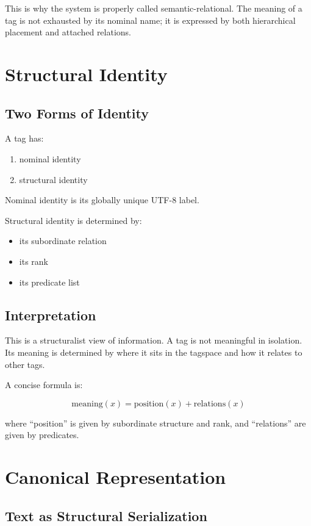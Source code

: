 \documentclass{article}
\begin{document}
This is why the system is properly called semantic-relational. The meaning
of a tag is not exhausted by its nominal name; it is expressed by both
hierarchical placement and attached relations.

\section{Structural Identity}

\subsection{Two Forms of Identity}

A tag has:

\begin{enumerate}[label=\arabic*.]
    \item nominal identity
    \item structural identity
\end{enumerate}

Nominal identity is its globally unique UTF-8 label.

Structural identity is determined by:

\begin{itemize}
    \item its subordinate relation
    \item its rank
    \item its predicate list
\end{itemize}

\subsection{Interpretation}

This is a structuralist view of information. A tag is not meaningful in
isolation. Its meaning is determined by where it sits in the tagspace and
how it relates to other tags.

A concise formula is:

\[
\mathrm{meaning}(x) =
\mathrm{position}(x) + \mathrm{relations}(x)
\]

where ``position'' is given by subordinate structure and rank, and
``relations'' are given by predicates.

\section{Canonical Representation}

\subsection{Text as Structural Serialization}
\end{document}
